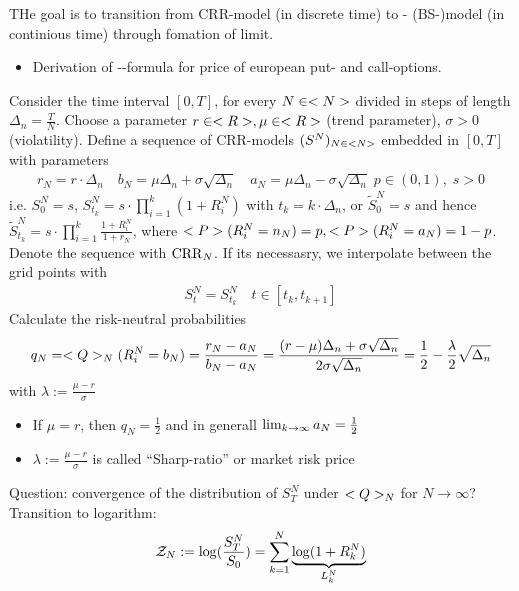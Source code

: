 ﻿THe goal is to transition from CRR-model (in discrete time) to - (BS-)model (in continious time) through fomation of limit.
\begin{itemize}
	\item Derivation of --formula for price of european put- and call-options. 
\end{itemize}
Consider the time interval $[0,T]$, for every $N \in \N$ divided in steps of length $\Delta_n = \frac{T}{N}$. Choose a parameter $r \in \R, \mu \in \R$ (trend parameter), $\sigma > 0$ (violatility). Define a sequence of CRR-models $(S^N)_{N \in \N}$ embedded in $[0,T]$ with parameters
\begin{align*}
	r_N = r \cdot \Delta_n \quad b_N = \mu \Delta_n + \sigma \sqrt{\Delta_n}\quad a_N = \mu \Delta_n - \sigma \sqrt{\Delta_n}\;p \in (0,1),\;s> 0
\end{align*}
i.e. $S^N_0 = s$, $S^N_{t_k} = s \cdot \prod_{i=1}^k (1+R_i^N)$ with $t_k = k \cdot \Delta_n$, or $\tilde{S}_0^N = s$ and hence $\tilde{S}^N_{t_k}= s \cdot \prod_{i=1}^k \frac{1+R_i^N}{1+r_N}$, where $\P(R^N_i = n_N) = p, \P(R^N_i = a_N) = 1-p$.
Denote the sequence with $\CRR_N$. If its necessasry, we interpolate between the grid points with
\begin{align*}
	S_t^N = S^N_{t_k} \quad t \in [t_k,t_{k+1}]
\end{align*}
Calculate the risk-neutral probabilities
\begin{align*}
	q_N = \QQ_N(R_i^N = b_N) = \frac{r_N - a_N}{b_N - a_N} = \frac{(r-\mu)\Delta_n + \sigma \sqrt{\Delta_n}}{2\sigma\sqrt{\Delta_n}} = \frac{1}{2} - \frac{\lambda}{2}\sqrt{\Delta_n}
\end{align*}
with $\lambda := \frac{\mu - r}{\sigma}$
\begin{*remark}
	\begin{itemize}
		\item If $\mu = r$, then $q_N = \frac{1}{2}$ and in generall $\lim_{k \to \infty}a_N = \half$
		\item $\lambda := \frac{\mu - r}{\sigma}$ is called ``Sharp-ratio'' or market risk price 
	\end{itemize}
\end{*remark}
Question: convergence of the distribution of $S^N_T$ under $\QQ_N$ for $N \to \infty$?\\
Transition to logarithm:
\begin{align*}
	\ZZ_N := \log(\frac{S^N_T}{S_0}) = \sum_{k=1}^N \underbrace{\log(1+R_k^N)}_{L^N_k}
\end{align*}
